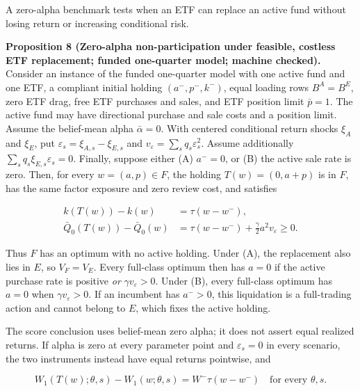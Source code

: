 \documentclass[11pt]{article}
\begin{document}
A zero-alpha benchmark tests when an ETF can replace an active
fund without losing return or increasing conditional risk.

\label{res:Proposition-8}
\textbf{Proposition 8 (Zero-alpha non-participation under feasible, costless ETF replacement; funded one-quarter model; machine checked).}
Consider an instance of the funded one-quarter model with one active
fund and one ETF, a compliant
initial holding \((a^-,p^-,k^-)\), equal loading rows \(B^A=B^E\), zero
ETF drag, free ETF purchases and sales, and ETF position limit
\(\bar p=1\). The active fund may have directional purchase and sale
costs and a position limit. Assume the belief-mean alpha
\(\bar\alpha=0\). With centered conditional return shocks \(\xi_A\)
and \(\xi_E\), put \(\varepsilon_s=\xi_{A,s}-\xi_{E,s}\) and
\(v_\varepsilon=\sum_s q_s\varepsilon_s^2\). Assume additionally
\(\sum_s q_s\xi_{E,s}\varepsilon_s=0\). Finally, suppose either
(A) \(a^-=0\), or (B) the active sale rate is zero. Then, for every
\(w=(a,p)\in F\), the holding \(T(w)=(0,a+p)\) is in \(F\), has the
same factor exposure and zero review cost, and satisfies

\begin{equation*}
\begin{aligned}
k(T(w))-k(w)&=\tau(w-w^-),\\
\bar Q_0(T(w))-\bar Q_0(w)
  &=\tau(w-w^-)+\frac{\gamma}{2}a^2v_\varepsilon\geq0.
\end{aligned}                                                     \tag{18}\label{eq:18}
\end{equation*}

Thus \(F\) has an optimum with no active holding. Under (A), the
replacement also lies in \(E\), so \(V_F=V_E\). Every full-class
optimum then has \(a=0\) if the active purchase rate is positive
\emph{or} \(\gamma v_\varepsilon>0\). Under (B), every full-class optimum
has \(a=0\) when \(\gamma v_\varepsilon>0\). If an incumbent has
\(a^->0\), this liquidation is a full-trading action and cannot
belong to \(E\), which fixes the active holding.

The score conclusion uses belief-mean zero alpha; it does not assert
equal realized returns. If alpha is zero at every parameter point
and \(\varepsilon_s=0\) in every scenario, the two instruments instead
have equal returns pointwise, and

\begin{equation*}
W_1(T(w);\theta,s)-W_1(w;\theta,s)
   =W^-\tau(w-w^-)\quad\text{for every }\theta,s.                 \tag{19}\label{eq:19}
\end{equation*}
\end{document}
